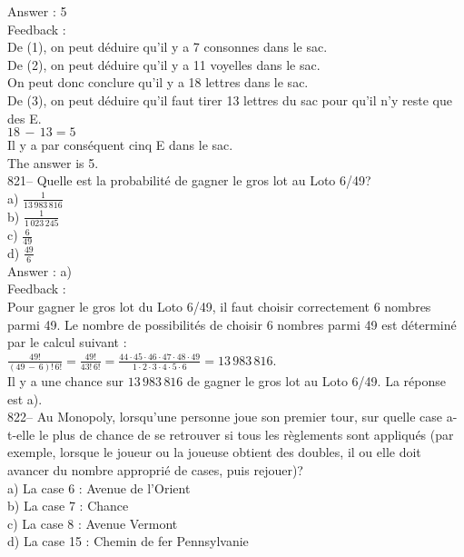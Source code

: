 ﻿\documentclass[letterpaper, 12pt]{article}
\begin{document}
Answer : 5\\

Feedback : \\
De (1), on peut d\'eduire qu'il y a 7 consonnes dans le sac.\\
De (2), on peut d\'eduire qu'il y a 11 voyelles dans le sac.\\
On peut donc conclure qu'il y a 18 lettres dans le sac.\\
De (3), on peut d\'eduire qu'il faut tirer 13 lettres du sac pour qu'il n'y
reste que des E.  \\
$18\,-\,13=5$\\
Il y a par cons\'equent cinq E dans le sac.\\
The answer is 5.\\


821-- Quelle est la probabilit\'e de gagner le gros lot au Loto 6/49?\\
a) $\frac{1}{13\,983\,816}$\\ [2mm] b) $\frac{1}{1\,023\,245}$\\
[2mm] c) $\frac{6}{49}$\\ [2mm]
d) $\frac{49}{6}$\\

Answer : a)\\

Feedback : \\
Pour gagner le gros lot du Loto 6/49, il faut choisir correctement 6 nombres
parmi 49.  Le nombre de possibilit\'es de choisir 6 nombres parmi 49 est
d\'etermin\'e par le calcul suivant :\\[2mm]
$\frac{49!}{\left( 49\,-\,6\right)
!\,6!}=\frac{49!}{43!\,6!}=\frac{44\cdot45\cdot46\cdot47\cdot48\cdot49}{1\cdot2\cdot3\cdot4\cdot5\cdot6}=13\,983\,816$.\\[2mm]
Il y a une chance sur $13\,983\,816$ de gagner le gros lot au Loto 6/49.  La
r\'eponse est a).\\

822-- Au Monopoly, lorsqu'une personne joue son premier tour, sur quelle
case a-t-elle le plus de chance de se retrouver si tous les r\`eglements
sont appliqu\'es (par exemple, lorsque le joueur ou la joueuse obtient des
doubles, il ou elle doit avancer du nombre appropri\'e de cases, puis
rejouer)?\\
a) La case 6 : Avenue de l'Orient\\
b) La case 7 : Chance\\
c) La case 8 : Avenue Vermont\\
d) La case 15 : Chemin de fer Pennsylvanie\\
\end{document}
